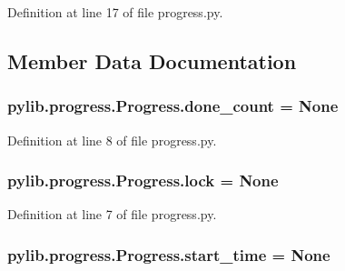 Definition at line 17 of file progress.\+py.



\subsection{Member Data Documentation}
\subsubsection[{\texorpdfstring{done\+\_\+count}{done_count}}]{\setlength{\rightskip}{0pt plus 5cm}pylib.\+progress.\+Progress.\+done\+\_\+count = None\hspace{0.3cm}{\ttfamily [static]}}\hypertarget{classpylib_1_1progress_1_1Progress_ac07d6b8453fb0aa744750c052e872fbf}{}\label{classpylib_1_1progress_1_1Progress_ac07d6b8453fb0aa744750c052e872fbf}


Definition at line 8 of file progress.\+py.

\subsubsection[{\texorpdfstring{lock}{lock}}]{\setlength{\rightskip}{0pt plus 5cm}pylib.\+progress.\+Progress.\+lock = None\hspace{0.3cm}{\ttfamily [static]}}\hypertarget{classpylib_1_1progress_1_1Progress_ac246085b3c5409b2827c60827d394cb2}{}\label{classpylib_1_1progress_1_1Progress_ac246085b3c5409b2827c60827d394cb2}


Definition at line 7 of file progress.\+py.

\subsubsection[{\texorpdfstring{start\+\_\+time}{start_time}}]{\setlength{\rightskip}{0pt plus 5cm}pylib.\+progress.\+Progress.\+start\+\_\+time = None\hspace{0.3cm}{\ttfamily [static]}}\hypertarget{classpylib_1_1progress_1_1Progress_a68f98a1bb08bc59fa8d3b8382e5dde53}{}\label{classpylib_1_1progress_1_1Progress_a68f98a1bb08bc59fa8d3b8382e5dde53}


